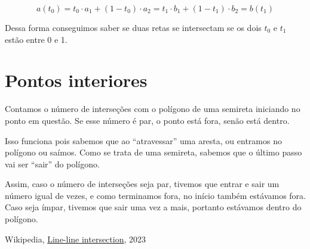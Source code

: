 \documentclass[12pt]{article}
\begin{document}
  \[
    a(t_0) = t_0 \cdot a_1 + (1-t_0) \cdot a_2 = t_1 \cdot b_1 + (1 - t_1) \cdot
    b_2 = b(t_1)
  \]

  Dessa forma conseguimos saber se duas retas se intersectam se os dois $t_0$ e
  $t_1$ estão entre 0 e 1.

  \section{Pontos interiores}
  Contamos o número de interseções com o polígono de uma semireta iniciando no
  ponto em questão. Se esse número é par, o ponto está fora, senão está dentro.

  Isso funciona pois sabemos que ao ``atravessar'' uma aresta, ou entramos no
  polígono ou saímos. Como se trata de uma semireta, sabemos que o último passo
  vai ser ``sair'' do polígono.

  Assim, caso o número de interseções seja par, tivemos que entrar e sair um
  número igual de vezes, e como terminamos fora, no início também estávamos
  fora. Caso seja ímpar, tivemos que sair uma vez a mais, portanto estávamos
  dentro do polígono.

  \begin{thebibliography}{9}
     Wikipedia,
      \href{https://en.wikipedia.org/wiki/Line-line_intersection}{Line-line
      intersection}, 2023
  \end{thebibliography}
\end{document}

